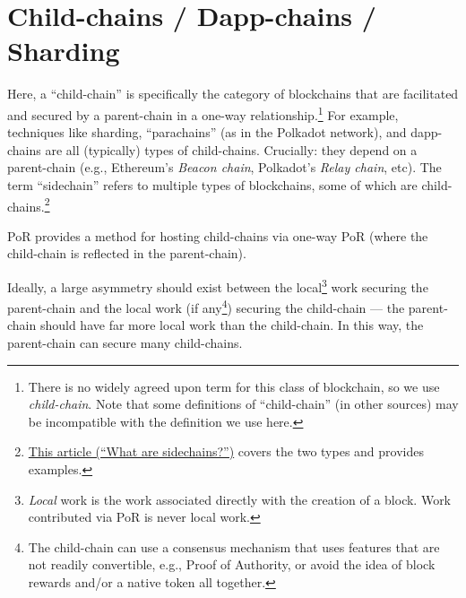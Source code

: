 \documentclass[a4paper,]{article}
\begin{document}


\section{Child-chains / Dapp-chains / Sharding}


Here, a ``child-chain'' is specifically the category of blockchains that are facilitated and secured by a parent-chain in a one-way relationship.\footnote{
  There is no widely agreed upon term for this class of blockchain, so we use \emph{child-chain}.
  Note that some definitions of ``child-chain'' (in other sources) may be incompatible with the definition we use here.
}
For example, techniques like sharding, ``parachains'' (as in the Polkadot network), and dapp-chains are all (typically) types of child-chains.
Crucially: they depend on a parent-chain (e.g., Ethereum's \emph{Beacon chain}, Polkadot's \emph{Relay chain}, etc).
The term ``sidechain'' refers to multiple types of blockchains, some of which are child-chains.\footnote{
  \href{https://www.bitcoin.com/get-started/what-are-sidechains/}{This article (``What are sidechains?'')} covers the two types and provides examples.
}

PoR provides a method for hosting child-chains via one-way PoR (where the child-chain is reflected in the parent-chain).

Ideally, a large asymmetry should exist between the local\footnote{
  \emph{Local} work is the work associated directly with the creation of a block.
  Work contributed via PoR is never local work.
} work securing the parent-chain and the local work (if any\footnote{
  The child-chain can use a consensus mechanism that uses features that are not readily convertible, e.g., Proof of Authority, or avoid the idea of block rewards and/or a native token all together.
}) securing the child-chain --- the parent-chain should have far more local work than the child-chain.
In this way, the parent-chain can secure many child-chains.
\end{document}
